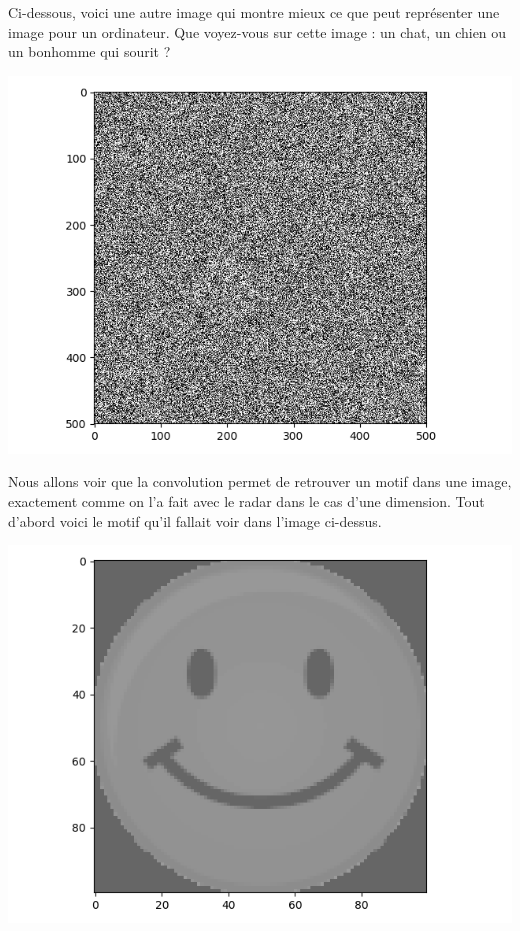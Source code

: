 \documentclass[11pt,class=report,crop=false]{standalone}
\begin{document}
Ci-dessous, voici une autre image qui montre mieux ce que peut représenter une image pour 
un ordinateur. Que voyez-vous sur cette image : un chat, un chien ou un bonhomme qui sourit ?

\begin{center}
\includegraphics[scale=\myscale,scale=0.5]{figures/correlation2d-3}
\end{center}


Nous allons voir que la convolution permet de retrouver un motif dans une image, exactement comme on l'a fait avec le radar dans le cas d'une dimension.
Tout d'abord voici le motif qu'il fallait \og{}voir\fg{} dans l'image ci-dessus.
\begin{center}
\includegraphics[scale=\myscale,scale=0.3]{figures/correlation2d-1}
\end{center}
\end{document}
